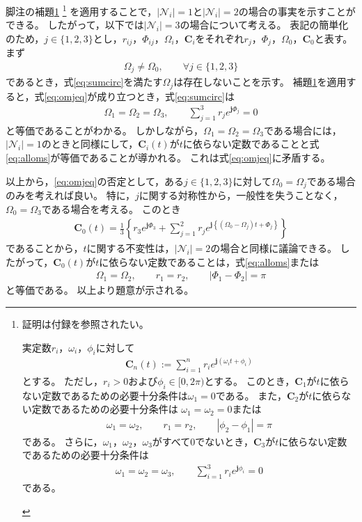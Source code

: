 \documentclass[tombow,dvipdfmx]{corona-a5-1.1}
\begin{document}
\begin{証明}
脚注の補題\ref{lem:sumc}
\footnote{
証明は付録を参照されたい。
\begin{補題*}\label{lem:sumc}
実定数$r_i$，$\omega_i$，$\phi_i$に対して
\begin{align*}
\bm{C}_n(t) := 
\sum_{i=1}^n r_i e^{ \bm{j} (\omega_i t + \phi_i)}
\end{align*}
とする。
ただし，$r_i>0$および$\phi_i \in [0,2\pi)$とする。
このとき，$\bm{C}_1$が$t$に依らない定数であるための必要十分条件は$\omega_1=0$である。
また，$\bm{C}_2$が$t$に依らない定数であるための必要十分条件は
$\omega_1=\omega_2=0$または
\begin{align*}
\omega_1=\omega_2
,\qquad
r_1=r_2
,\qquad
|\phi_2-\phi_1| = \pi
\end{align*}
である。
さらに，$\omega_1$，$\omega_2$，$\omega_3$がすべて0でないとき，$\bm{C}_3$が$t$に依らない定数であるための必要十分条件は
\begin{align*}
\omega_1=\omega_2=\omega_3
,\qquad
\sum_{i=1}^3 r_i e^{\bm{j}\phi_i}=0
\end{align*}
である。
\end{補題*}
}
を適用することで，$|\mathcal{N}_i|=1$と$|\mathcal{N}_i|=2$の場合の事実を示すことができる。
したがって，以下では$|\mathcal{N}_i|=3$の場合について考える。
表記の簡単化のため，$j \in\{1,2,3\}$とし，$r_{ij}$，$\Phi_{ij}$，$\Omega_i$，$\bm{C}_i$をそれぞれ$r_{j}$，$\Phi_{j}$，$\Omega_0$，$\bm{C}_0$と表す。
まず
\begin{align}\label{eq:omjeq}
\Omega_j \neq \Omega_0
,\qquad \forall j \in \{1,2,3\}
\end{align}
であるとき，式\ref{eq:sumcirc}を満たす$\Omega_j$は存在しないことを示す。
補題\ref{lem:sumc}を適用すると，式\ref{eq:omjeq}が成り立つとき，式\ref{eq:sumcirc}は
\begin{align*}
\Omega_1 = \Omega_2 = \Omega_3,\qquad
\sum_{j=1}^3 
r_j e^{\bm{j} \Phi_j}=0
\end{align*}
と等価であることがわかる。
しかしながら，$\Omega_1 = \Omega_2 = \Omega_3$である場合には，$|\mathcal{N}_i|=1$のときと同様にして，$\bm{C}_i (t)$が$t$に依らない定数であることと式\ref{eq:alloms}が等価であることが導かれる。
これは式\ref{eq:omjeq}に矛盾する。

以上から，\ref{eq:omjeq}の否定として，ある$j\in\{1,2,3\}$に対して$\Omega_0=\Omega_j$である場合のみを考えれば良い。
特に，$j$に関する対称性から，一般性を失うことなく，$\Omega_0=\Omega_3$である場合を考える。
このとき
\begin{align*}
\bm{C}_0 (t) = \frac{1}{3} \left\{
r_3 e^{\bm{j} \Phi_3}
+
\sum_{j=1}^2
r_{j}
e^{\bm{j} 
\left\{
(\Omega_0 - \Omega_j)t + 
\Phi_{j}
\right\} }
\right\}
\end{align*}
であることから，$t$に関する不変性は，$|\mathcal{N}_i|=2$の場合と同様に議論できる。
したがって，$\bm{C}_0 (t)$が$t$に依らない定数であることは，式\ref{eq:alloms}または
\begin{align*}
\Omega_{1} = \Omega_{2}
,\qquad
r_{1} = r_{2}
,\qquad
|\Phi_{1}-\Phi_{2}| = \pi
\end{align*}
と等価である。
以上より題意が示される。
\end{証明}
\end{document}
